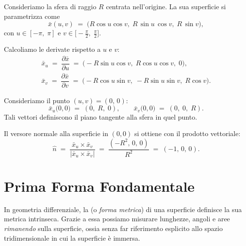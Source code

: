\begin{exampleblock}
Consideriamo la sfera di raggio $R$ centrata nell’origine. La sua superficie si parametrizza come
$$
\bar{x}(u,v)
\;=\;
\bigl(R \cos u \cos v,\;R \,\sin u \,\cos v,\;R \,\sin v\bigr),
$$
con $u \in [-\pi,\;\pi]$ e $v \in \bigl[-\tfrac{\pi}{2},\;\tfrac{\pi}{2}\bigr]$.
\vspace{0.5em}

Calcoliamo le derivate rispetto a $u$ e $v$:
\vspace{0.4em}
$$
\begin{array}{l}
\bar{x}_u
\;=\;
\dfrac{\partial \bar{x}}{\partial u}
\;=\;
\bigl(-R \sin u \cos v,\;R \cos u \cos v,\;0\bigr),
\\
\bar{x}_v
\;=\;
\dfrac{\partial \bar{x}}{\partial v}
\;=\;
\bigl(-R \cos u \sin v,\;-R \sin u \sin v,\;R \cos v\bigr).
\end{array}
$$

Consideriamo il punto $(u,v) = (0,\,0)$:
\vspace{0.4em}
$$
\bar{x}_u\bigl(0,0\bigr)
\;=\;
(0,\;R,\;0),
\qquad
\bar{x}_v\bigl(0,0\bigr)
\;=\;
(0,\;0,\;R).
$$
Tali vettori definiscono il piano tangente alla sfera in quel punto.

Il versore normale alla superficie in $(0,0)$ si ottiene con il prodotto vettoriale:
$$
\hat{n}
\;=\;
\frac{\bar{x}_u \times \bar{x}_v}{\bigl|\bar{x}_u \times \bar{x}_v\bigr|}
\;=\;
\frac{(-R^2,\,0,\,0)}{R^2}
\;=\;
(-1,\,0,\,0).
$$
\end{exampleblock}


\newpage

\section{Prima Forma Fondamentale}

In geometria differenziale, la  (o \textit{forma metrica}) di una superficie definisce la sua metrica intrinseca. Grazie a essa possiamo misurare lunghezze, angoli e aree \emph{rimanendo} sulla superficie, ossia senza far riferimento esplicito allo spazio tridimensionale in cui la superficie è immersa.

